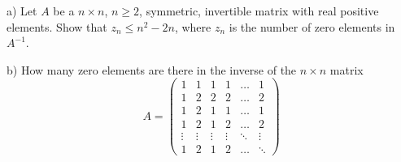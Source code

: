 a) Let $A$ be a $n\times n$, $n\geq 2$, symmetric, invertible matrix with real positive elements. Show that $z_n\leq n^2-2n$, where $z_n$ is the number of zero elements in $A^{-1}$.

b) How many zero elements are there in the inverse of the $n\times n$ matrix
$$A=\begin{pmatrix} 1&1&1&1&\ldots&1\\
1&2&2&2&\ldots&2\\
1&2&1&1&\ldots&1\\
1&2&1&2&\ldots&2\\
\vdots&\vdots&\vdots&\vdots&\ddots&\vdots\\
1&2&1&2&\ldots&\ddots
\end{pmatrix}$$